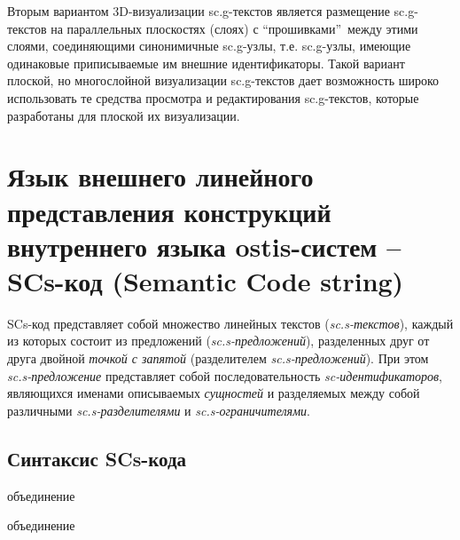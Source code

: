 Вторым вариантом 3D-визуализации sc.g-текстов является размещение sc.g-текстов на параллельных плоскостях (слоях) с “прошивками”\ между этими слоями, соединяющими синонимичные sc.g-узлы, т.е. sc.g-узлы, имеющие одинаковые приписываемые им внешние идентификаторы. Такой вариант плоской, но многослойной визуализации sc.g-текстов дает возможность широко использовать те средства просмотра и редактирования sc.g-текстов, которые разработаны для плоской их визуализации.


\section{Язык внешнего линейного представления конструкций внутреннего языка ostis-систем -- SCs-код (Semantic Code string)}
\label{sec_scs}


\begin{SCn}
\end{SCn}

SCs-код представляет собой множество линейных текстов (\textit{sc.s-текстов}), каждый из которых состоит из предложений (\textit{sc.s-предложений}), разделенных друг от друга двойной \textit{точкой с запятой} (разделителем \textit{sc.s-предложений}). При этом \mbox{\textit{sc.s-предложение}} представляет собой последовательность \textit{sc-идентификаторов}, являющихся именами описываемых \textit{сущностей} и разделяемых между собой различными \textit{sc.s-разделителями} и \textit{sc.s-ограничителями}.


\subsection{Синтаксис SCs-кода}

\begin{SCn}
	\begin{scnreltoset}{объединение}
			\begin{scnreltoset}{объединение}
			\end{scnreltoset}
	\end{scnreltoset}
\end{SCn} 


